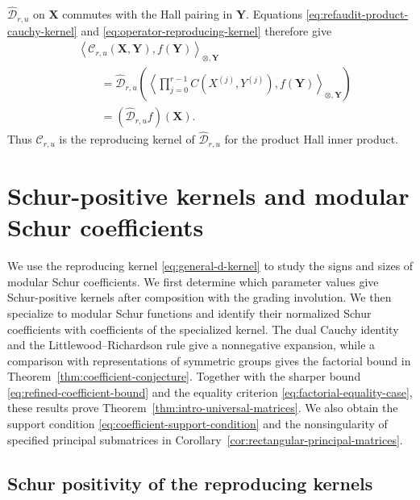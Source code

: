 \documentclass[12pt,reqno,a4paper]{amsart}
\numberwithin{equation}{section}
\numberwithin{figure}{section}
\theoremstyle{plain}
\theoremstyle{definition}
\begin{document}
$\widehat{\mathcal D}_{r,u}$ on $\mathbf X$ commutes with the Hall
pairing in $\mathbf Y$.  Equations
\eqref{eq:refaudit-product-cauchy-kernel} and
\eqref{eq:operator-reproducing-kernel} therefore give
\begin{align*}
 &\left\langle
   \mathcal C_{r,u}(\mathbf X,\mathbf Y),f(\mathbf Y)
  \right\rangle_{\otimes,\mathbf Y}\\
 &\qquad=\widehat{\mathcal D}_{r,u}\left(
  \left\langle\prod_{j=0}^{r-1}C(X^{(j)},Y^{(j)}),f(\mathbf Y)
  \right\rangle_{\otimes,\mathbf Y}\right)\\
 &\qquad=(\widehat{\mathcal D}_{r,u}f)(\mathbf X).
\end{align*}
Thus $\mathcal C_{r,u}$ is the reproducing kernel of
$\widehat{\mathcal D}_{r,u}$ for the product Hall inner product.

\section{Schur-positive kernels and modular Schur coefficients}
\label{sec:modular-schur-coefficients}

We use the reproducing kernel \eqref{eq:general-d-kernel} to study
the signs and sizes of modular Schur coefficients.  We first
determine which parameter values give Schur-positive kernels after
composition with the grading involution.  We then specialize to
modular Schur functions and identify their normalized Schur
coefficients with coefficients of the specialized kernel.  The dual
Cauchy identity and the Littlewood--Richardson rule give a
nonnegative expansion, while a comparison with representations of
symmetric groups gives the factorial bound in
Theorem~\ref{thm:coefficient-conjecture}.  Together with the sharper
bound \eqref{eq:refined-coefficient-bound} and the equality criterion
\eqref{eq:factorial-equality-case}, these results prove
Theorem~\ref{thm:intro-universal-matrices}.  We also obtain the
support condition \eqref{eq:coefficient-support-condition} and the
nonsingularity of specified principal submatrices in
Corollary~\ref{cor:rectangular-principal-matrices}.

\subsection{Schur positivity of the reproducing kernels}
\label{subsec:universal-matrices}
\label{subsec:integral-specializations}
\end{document}
